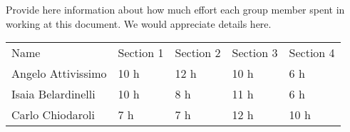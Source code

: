 Provide here information about how much effort each group member spent in working at this document. We would appreciate details here.


\begin{center}
    \begin{tabu}{|X[1.5]|X|X|X|X|} \hline \everyrow{\hline}
        Name & Section 1 & Section 2 & Section 3 & Section 4 \\ 
        Angelo Attivissimo & 10 h & 12 h & 10 h & 6 h \\
        Isaia Belardinelli & 10 h & 8 h & 11 h & 6 h \\
        Carlo Chiodaroli & 7 h & 7 h & 12 h & 10 h \\ 
    \end{tabu}
\end{center}
